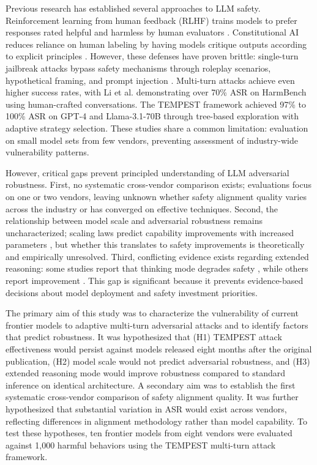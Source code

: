 \documentclass[11pt,a4paper]{article}
\begin{document}
Previous research has established several approaches to LLM safety. Reinforcement learning from human feedback (RLHF) trains models to prefer responses rated helpful and harmless by human evaluators \cite{ouyang2022training}. Constitutional AI reduces reliance on human labeling by having models critique outputs according to explicit principles \cite{bai2022constitutional}. However, these defenses have proven brittle: single-turn jailbreak attacks bypass safety mechanisms through roleplay scenarios, hypothetical framing, and prompt injection \cite{wei2023jailbroken, zou2023universal}. Multi-turn attacks achieve even higher success rates, with Li et al. \cite{li2024llm} demonstrating over 70\% ASR on HarmBench using human-crafted conversations. The TEMPEST framework \cite{zhou2025tempest} achieved 97\% to 100\% ASR on GPT-4 and Llama-3.1-70B through tree-based exploration with adaptive strategy selection. These studies share a common limitation: evaluation on small model sets from few vendors, preventing assessment of industry-wide vulnerability patterns.

However, critical gaps prevent principled understanding of LLM adversarial robustness. First, no systematic cross-vendor comparison exists; evaluations focus on one or two vendors, leaving unknown whether safety alignment quality varies across the industry or has converged on effective techniques. Second, the relationship between model scale and adversarial robustness remains uncharacterized; scaling laws predict capability improvements with increased parameters \cite{kaplan2020scaling}, but whether this translates to safety improvements is theoretically and empirically unresolved. Third, conflicting evidence exists regarding extended reasoning: some studies report that thinking mode degrades safety \cite{wang2025outthink, li2025hcot}, while others report improvement \cite{chen2025weakestlink, cao2025r2d}. This gap is significant because it prevents evidence-based decisions about model deployment and safety investment priorities.

The primary aim of this study was to characterize the vulnerability of current frontier models to adaptive multi-turn adversarial attacks and to identify factors that predict robustness. It was hypothesized that (H1) TEMPEST attack effectiveness would persist against models released eight months after the original publication, (H2) model scale would not predict adversarial robustness, and (H3) extended reasoning mode would improve robustness compared to standard inference on identical architecture. A secondary aim was to establish the first systematic cross-vendor comparison of safety alignment quality. It was further hypothesized that substantial variation in ASR would exist across vendors, reflecting differences in alignment methodology rather than model capability. To test these hypotheses, ten frontier models from eight vendors were evaluated against 1,000 harmful behaviors using the TEMPEST multi-turn attack framework.
\end{document}
